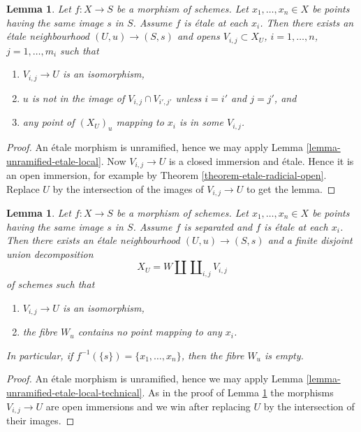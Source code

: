 \documentclass{stacks-project}
\theoremstyle{plain}
\newtheorem{lemma}[subsection]{Lemma}
\theoremstyle{definition}
\theoremstyle{remark}
\numberwithin{equation}{subsection}
\begin{document}
\begin{lemma}
\label{lemma-etale-etale-local}
Let $f : X \to S$ be a morphism of schemes.
Let $x_1, \ldots, x_n \in X$ be points having the same image $s$ in $S$.
Assume $f$ is \'etale at each $x_i$.
Then there exists an \'etale neighbourhood $(U, u) \to (S, s)$
and opens $V_{i, j} \subset X_U$, $i = 1, \ldots, n$, $j = 1, \ldots, m_i$
such that
\begin{enumerate}
\item $V_{i, j} \to U$ is an isomorphism,
\item $u$ is not in the image of $V_{i, j} \cap V_{i', j'}$ unless
$i = i'$ and $j = j'$, and
\item any point of $(X_U)_u$ mapping to $x_i$ is in some $V_{i, j}$.
\end{enumerate}
\end{lemma}

\begin{proof}
An \'etale morphism is unramified, hence we may apply
Lemma \ref{lemma-unramified-etale-local}.
Now $V_{i, j} \to U$ is a closed immersion and \'etale.
Hence it is an open immersion, for example by
Theorem \ref{theorem-etale-radicial-open}.
Replace $U$ by the intersection of the images of $V_{i, j} \to U$
to get the lemma.
\end{proof}

\begin{lemma}
\label{lemma-etale-etale-local-technical}
Let $f : X \to S$ be a morphism of schemes.
Let $x_1, \ldots, x_n \in X$ be points having the same image $s$ in $S$.
Assume $f$ is separated and $f$ is \'etale at each $x_i$.
Then there exists an \'etale neighbourhood $(U, u) \to (S, s)$
and a finite disjoint union decomposition
$$
X_U =
W \amalg \coprod\nolimits_{i, j} V_{i, j}
$$
of schemes such that
\begin{enumerate}
\item $V_{i, j} \to U$ is an isomorphism,
\item the fibre $W_u$ contains no point mapping to any $x_i$.
\end{enumerate}
In particular, if $f^{-1}(\{s\}) = \{x_1, \ldots, x_n\}$, then
the fibre $W_u$ is empty.
\end{lemma}

\begin{proof}
An \'etale morphism is unramified, hence we may apply
Lemma \ref{lemma-unramified-etale-local-technical}.
As in the proof of
Lemma \ref{lemma-etale-etale-local}
the morphisms $V_{i, j} \to U$ are open immersions and
we win after replacing $U$ by the intersection of their
images.
\end{proof}
\end{document}
